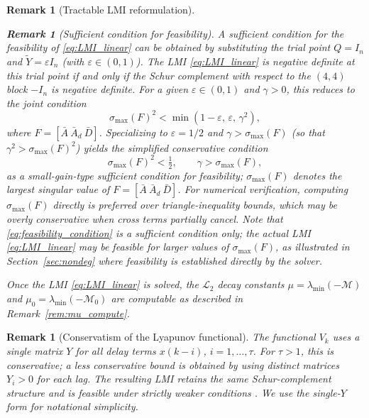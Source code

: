 \documentclass[10pt]{amsart}
\numberwithin{equation}{section}
\newtheorem{remark}[theorem]{Remark}
\begin{document}
\begin{remark}[Tractable LMI reformulation]
\begin{remark}[Sufficient condition for feasibility]\label{rem:feasibility}
A sufficient condition for the feasibility of \eqref{eq:LMI_linear} can be obtained by
substituting the trial point $Q = I_n$ and $\tilde{Y} = \varepsilon I_n$ (with
$\varepsilon \in (0,1)$). The LMI \eqref{eq:LMI_linear} is negative definite at this
trial point if and only if the Schur complement with respect to the $(4,4)$ block
$-I_n$ is negative definite. For a given $\varepsilon \in (0,1)$ and $\gamma > 0$, this
reduces to the joint condition
\begin{equation}\label{eq:feasibility_joint}
  \sigma_{\max}(F)^2 < \min(1-\varepsilon,\, \varepsilon,\, \gamma^2),
\end{equation}
where $F = [\bar{A}\ \bar{A}_d\ \bar{D}]$. Specializing to $\varepsilon = 1/2$ and
$\gamma > \sigma_{\max}(F)$ (so that $\gamma^2 > \sigma_{\max}(F)^2$) yields
the simplified conservative condition
\begin{equation}\label{eq:feasibility_condition}
  \sigma_{\max}(F)^2 < \tfrac{1}{2}, \qquad \gamma > \sigma_{\max}(F),
\end{equation}
as a small-gain-type sufficient condition for feasibility; $\sigma_{\max}(F)$ denotes
the largest singular value of $F = [\bar{A}\ \bar{A}_d\ \bar{D}]$. For numerical
verification, computing $\sigma_{\max}(F)$ directly is preferred over
triangle-inequality bounds, which may be overly conservative when cross terms
partially cancel. Note that \eqref{eq:feasibility_condition} is a \emph{sufficient}
condition only; the actual LMI \eqref{eq:LMI_linear} may be feasible for larger values
of $\sigma_{\max}(F)$, as illustrated in Section~\ref{sec:nondeg} where feasibility is
established directly by the solver.
\end{remark}

Once the LMI \eqref{eq:LMI_linear} is solved, the $\mathcal{L}_2$ decay constants
$\mu = \lambda_{\min}(-\mathcal{M})$ and $\mu_0 = \lambda_{\min}(-\mathcal{M}_0)$
are computable as described in Remark~\ref{rem:mu_compute}.
\end{remark}

\begin{remark}[Conservatism of the Lyapunov functional]\label{rem:conservatism}
The functional $V_k$ uses a single matrix $Y$ for all delay terms $x(k-i)$,
$i=1,\ldots,\tau$. For $\tau > 1$, this is conservative; a less conservative bound is
obtained by using distinct matrices $Y_i > 0$ for each lag. The resulting LMI retains
the same Schur-complement structure and is feasible under strictly weaker conditions
\cite{Fridman2014}. We use the single-$Y$ form for notational simplicity.
\end{remark}
\end{document}
